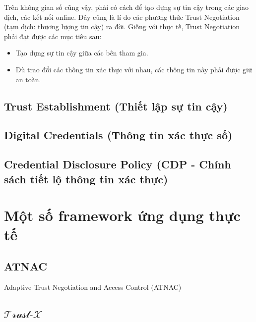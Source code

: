 \documentclass[12pt]{article}
\newcommand{\trustx}{$\mathcal{\text{Trust-}X}$}
\begin{document}
Trên không gian số cũng vậy, phải có cách để tạo dựng sự tin cậy trong các giao dịch, các kết nối online. Đây cũng là lí do các phương thức Trust Negotiation (tạm dịch: thương lượng tin cậy) ra đời. Giống với thực tế, Trust Negotiation phải đạt được các mục tiêu sau:
\begin{itemize}
\item Tạo dựng sự tin cậy giữa các bên tham gia.
\item Dù trao đổi các thông tin xác thực với nhau, các thông tin này phải được giữ an toàn. 
\end{itemize}

\subsection{Trust Establishment (Thiết lập sự tin cậy)}


\subsection{Digital Credentials (Thông tin xác thực số)}

\subsection{Credential Disclosure Policy (CDP - Chính sách tiết lộ thông tin xác thực)}

\section{Một số framework ứng dụng thực tế}
\subsection{ATNAC}
Adaptive Trust Negotiation and Access Control (ATNAC)

\subsection{\trustx}



\end{document}
